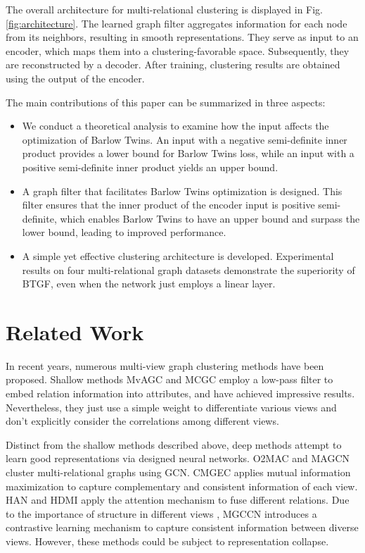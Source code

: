 \documentclass[letterpaper]{article} %
\begin{document}
The overall architecture for multi-relational clustering is displayed in Fig. \ref{fig:architecture}. The learned graph filter aggregates information for each node from its neighbors, resulting in smooth representations. They serve as input to an encoder, which maps them into a clustering-favorable space. Subsequently, they are reconstructed by a decoder. After training, clustering results are obtained using the output of the encoder.

The main contributions of this paper can be summarized in three aspects:
\begin{itemize}
    \item We conduct a theoretical analysis to examine how the input affects the optimization of Barlow Twins. An input with a negative semi-definite inner product provides a lower bound for Barlow Twins loss, while an input with a positive semi-definite inner product yields an upper bound.

    \item A graph filter that facilitates Barlow Twins optimization is designed.  This filter ensures that the inner product of the encoder input is positive semi-definite, which enables Barlow Twins to have an upper bound and surpass the lower bound, leading to improved performance.

    \item A simple yet effective clustering architecture is developed. Experimental results on four multi-relational graph datasets demonstrate the superiority of BTGF, even when the network just employs a linear layer.
\end{itemize}


\section{Related Work}

In recent years, numerous multi-view graph clustering methods have been proposed. Shallow methods MvAGC \cite{lin2021graph} and MCGC \cite{pan2021multi} employ a low-pass filter to embed relation information into attributes, and have achieved impressive results. Nevertheless, they just use a simple weight to differentiate various views and don't explicitly consider the correlations among different views.

Distinct from the shallow methods described above, deep methods attempt to learn good representations via designed neural networks. O2MAC \cite{fan2020one2multi} and MAGCN \cite{cheng2021multi} cluster multi-relational graphs using GCN. CMGEC \cite{wang2021consistent} applies mutual information maximization to capture complementary and consistent information of each view. HAN \cite{10.1145/3308558.3313562} and HDMI \cite{jing2021hdmi} apply the attention mechanism to fuse different relations. Due to the importance of structure in different views \cite{fang2022structure}, MGCCN \cite{10.1016/j.ins.2022.09.042} introduces a contrastive learning mechanism to capture consistent information between diverse views. However, these methods could be subject to representation collapse.
\end{document}
